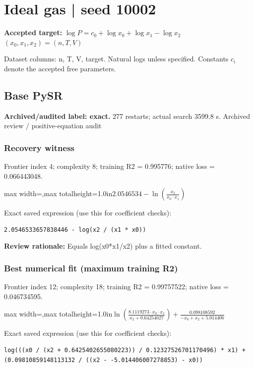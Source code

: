 \documentclass[10pt,letterpaper,landscape]{article}
\begin{document}
\section*{Ideal gas | seed 10002}
\textbf{Accepted target:} $\displaystyle \log P=c_0+\log x_0+\log x_1-\log x_2$\hfill $(x_0,x_1,x_2)=(n,T,V)$\par
{\small Dataset columns: n, T, V, target. Natural logs unless specified. Constants $c_i$ denote the accepted free parameters.}\par\medskip
\begin{minipage}[t]{0.485\textwidth}
\subsection*{Base PySR}
\textbf{Archived/audited label: exact.} 277 restarts; actual search 3599.8 s.
{\small Archived review / positive-equation audit}
\subsubsection*{Recovery witness}
Frontier index 4; complexity 8; training R2 = 0.995776; native loss = 0.066443048.
\begin{center}\begin{adjustbox}{max width=\linewidth,max totalheight=1.0in}$\displaystyle 2.0546534 - \ln{\left(\frac{x_{2}}{x_{0} \cdot x_{1}} \right)}$\end{adjustbox}\end{center}
{\scriptsize Exact saved expression (use this for coefficient checks):}
\begin{lstlisting}
2.0546533657838446 - log(x2 / (x1 * x0))
\end{lstlisting}
{\small\textbf{Review rationale:} Equals log(x0*x1/x2) plus a fitted constant.}
\subsubsection*{Best numerical fit (maximum training R2)}
Frontier index 12; complexity 18; training R2 = 0.99757522; native loss = 0.046734595.
\begin{center}\begin{adjustbox}{max width=\linewidth,max totalheight=1.0in}$\displaystyle \ln{\left(\frac{8.1119273 \cdot x_{0} \cdot x_{1}}{x_{2} + 0.64254027} \right)} + \frac{0.098108592}{- x_{0} + x_{2} + 5.014406}$\end{adjustbox}\end{center}
{\scriptsize Exact saved expression (use this for coefficient checks):}
\begin{lstlisting}
log(((x0 / (x2 + 0.6425402655080223)) / 0.12327526701170496) * x1) + (0.09810859148113132 / ((x2 - -5.014406007278853) - x0))
\end{lstlisting}
\end{minipage}\hfill
\end{document}
